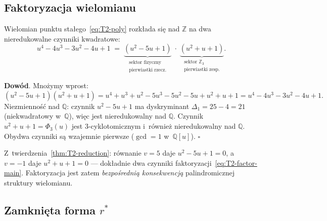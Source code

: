 \subsection{Faktoryzacja wielomianu}\label{app:T2-factorization}

\begin{theorem}\label{thm:T2-factor}
Wielomian punktu sta\l{}ego~\eqref{eq:T2-poly} rozk\l{}ada si\k{e}
nad $\mathbb{Z}$ na dwa nieredukowalne czynniki kwadratowe:
\begin{equation}\label{eq:T2-factor-main}
  u^4 - 4u^3 - 3u^2 - 4u + 1
  \;=\;
  \underbrace{(u^2 - 5u + 1)}_{\substack{\text{sektor fizyczny}\\\text{pierwiastki rzecz.}}}
  \;\cdot\;
  \underbrace{(u^2 + u + 1)}_{\substack{\text{sektor }\mathbb{Z}_3\\\text{pierwiastki zesp.}}}.
\end{equation}

\textbf{Dow\'od}.
Mno\.zymy wprost:
\[
  (u^2-5u+1)(u^2+u+1)
  = u^4 + u^3 + u^2 - 5u^3 - 5u^2 - 5u + u^2 + u + 1
  = u^4 - 4u^3 - 3u^2 - 4u + 1.
\]
Niezmienno\'s\'c nad $\mathbb{Q}$: czynnik $u^2-5u+1$ ma dyskryminant
$\Delta_1 = 25-4 = 21$ (niekwadratowy w~$\mathbb{Q}$), wi\k{e}c jest
nieredukowalny nad $\mathbb{Q}$.  Czynnik $u^2+u+1 = \Phi_3(u)$
jest 3-cyklotomicznym i~r\'ownie\.z nieredukowalny nad $\mathbb{Q}$.
Obydwa czynniki s\k{a} wzajemnie pierwsze ($\gcd = 1$ w~$\mathbb{Q}[u]$).
\hfill$\square$
\end{theorem}

\begin{remark}
Z~twierdzenia~\ref{thm:T2-reduction}: r\'ownanie $v=5$ daje
$u^2-5u+1=0$, a~$v=-1$ daje $u^2+u+1=0$ ---
dok\l{}adnie dwa czynniki faktoryzacji~\eqref{eq:T2-factor-main}.
Faktoryzacja jest zatem \emph{bezpo\'sredni\k{a} konsekwencj\k{a}}
palindromicznej struktury wielomianu.
\end{remark}


\subsection{Zamkni\k{e}ta forma $r^*$}\label{app:T2-closed-form}

